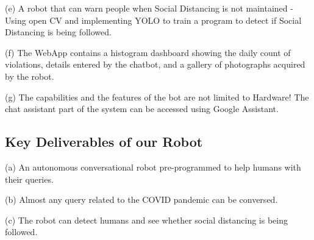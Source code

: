 \documentclass[AMA,STIX1COL]{WileyNJD-v2}
\begin{document}
(e) A robot that can warn people when Social Distancing is not maintained - Using open CV and implementing YOLO to train a program to detect if Social Distancing is being followed. 

(f) The WebApp contains a histogram dashboard showing the daily count of violations, details entered by the chatbot, and a gallery of photographs acquired by the robot.

(g) The capabilities and the features of the bot are not limited to Hardware! The chat assistant part of the system can be accessed using Google Assistant.








\subsection{Key Deliverables of our Robot}


\quad(a) An autonomous conversational robot pre-programmed to help humans with their queries.

(b) Almost any query related to the COVID pandemic can be conversed.

(c) The robot can detect humans and see whether social distancing is being followed.
\end{document}
